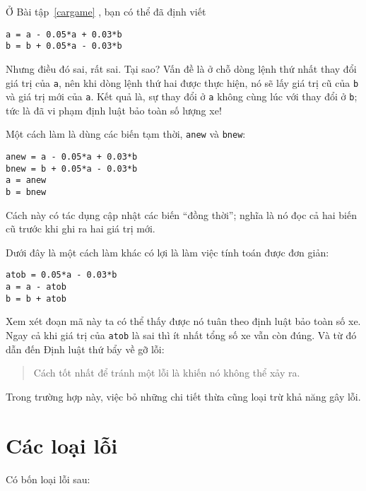 \documentclass[12pt]{book}
\begin{document}
Ở Bài tập~\ref{cargame} , bạn có thể đã định viết

\begin{verbatim}
a = a - 0.05*a + 0.03*b
b = b + 0.05*a - 0.03*b
\end{verbatim}
%
Nhưng điều đó sai, rất sai. Tại sao? Vấn đề là ở chỗ dòng lệnh 
thứ nhất thay đổi giá trị của {\tt a}, nên khi dòng lệnh thứ hai 
được thực hiện, nó sẽ lấy giá trị cũ của {\tt b} và giá trị mới của
{\tt a}. Kết quả là, sự thay đổi ở {\tt a} không cùng lúc với thay
đổi ở {\tt b}; tức là đã vi phạm định luật bảo toàn số lượng xe!

Một cách làm là dùng các biến tạm thời, {\tt anew} và {\tt bnew}:

\begin{verbatim}
anew = a - 0.05*a + 0.03*b
bnew = b + 0.05*a - 0.03*b
a = anew
b = bnew
\end{verbatim}
%
Cách này có tác dụng cập nhật các biến ``đồng thời''; nghĩa là
nó đọc cả hai biến cũ trước khi ghi ra hai giá trị mới.

Dưới đây là một cách làm khác có lợi là làm việc tính toán được
đơn giản:

\begin{verbatim}
atob = 0.05*a - 0.03*b
a = a - atob
b = b + atob
\end{verbatim}
%
Xem xét đoạn mã này ta có thể thấy được nó tuân theo định luật
bảo toàn số xe. Ngay cả khi giá trị của {\tt atob} là sai thì ít nhất 
tổng số xe vẫn còn đúng. Và từ đó dẫn đến Định luật thứ bẩy về
gỡ lỗi:

\begin{quote}
Cách tốt nhất để tránh một lỗi là khiến nó không thể xảy ra.
\end{quote}

Trong trường hợp này, việc bỏ những chi tiết thừa cũng loại trừ 
khả năng gây lỗi.


\section{Các loại lỗi}

Có bốn loại lỗi sau:
\end{document}

